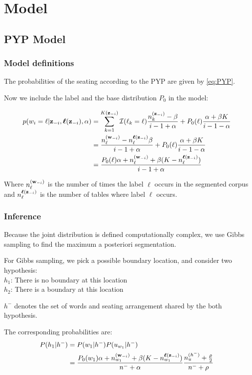 \section{Model}

\subsection{PYP Model}
\subsubsection{Model definitions}

The probabilities of the seating according to the PYP are given by \eqref{eq:PYP}.

Now we include the label and the base distribution $P_0$ in the model:

\begin{align}
p(w_i=\ell|\bm{\mathbf{z}}_{-i},\bm{\mathbf{\ell}}(\bm{\mathbf{z}}_{-i}),\alpha) &= \sum_{k=1}^{K(\bm{\mathbf{z}}_{-i})}\mathcal{I}(\ell_k=\ell)\dfrac{n_k^{(\bm{\mathbf{z}}_{-i})}-\beta}{i - 1 + \alpha} + P_0(\ell)\dfrac{\alpha + \beta K}{i -1 -\alpha} \\
&= \dfrac{n_{\ell}^{(\bm{\mathbf{w}}_{-i})}- n_{\ell}^{\bm{\mathbf{\ell}}(\bm{\mathbf{z}}_{-i})}\beta}{i - 1 + \alpha} + P_0(\ell)\dfrac{\alpha + \beta K}{i -1 -\alpha} \\
&= \dfrac{P_0(\ell)\alpha + n_{\ell}^{(\bm{\mathbf{w}}_{-i})}+ \beta (K - n_{\ell}^{\bm{\mathbf{\ell}}(\bm{\mathbf{z}}_{-i})})}{i - 1 + \alpha} 
\end{align}

Where $n_{\ell}^{(\bm{\mathbf{w}}_{-i})}$ is the number of times the label $\ell$ occurs in the segmented corpus and $n_{\ell}^{\bm{\mathbf{\ell}}(\bm{\mathbf{z}}_{-i})}$ is the number of tables where label $\ell$ occurs.

\subsubsection{Inference}

Because the joint distribution is defined computationally complex, we use Gibbs sampling to find the maximum a posteriori segmentation.

For Gibbs sampling, we pick a possible boundary location, and consider two hypothesis:
\\
$h_1$: There is no boundary at this location \\
$h_2$: There is a boundary at this location

$h^-$ denotes the set of words and seating arrangement shared by the both hypothesis.

The corresponding probabilities are:
\begin{align}
P(h_1 | h^-) &= P(w_1|h^-)P(u_{w_1} | h^{-}) \\
&= \dfrac{P_0(w_1)\alpha + n_{w_1}^{(\bm{\mathbf{w}}_{-i})}+ \beta (K - n_{w_1}^{\bm{\mathbf{\ell}}(\bm{\mathbf{z}}_{-i})})}{n^- + \alpha}
\dfrac{n_u^{(h^-)} + \frac{\rho}{2}}{n^- + \rho}
\end{align}

